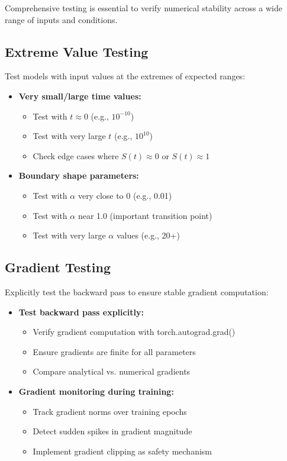 Comprehensive testing is essential to verify numerical stability across a wide range of inputs and conditions.

\subsection{Extreme Value Testing}

Test models with input values at the extremes of expected ranges:

\begin{itemize}
    \item \textbf{Very small/large time values:}
    \begin{itemize}
        \item Test with $t \approx 0$ (e.g., $10^{-10}$)
        \item Test with very large $t$ (e.g., $10^{10}$)
        \item Check edge cases where $S(t) \approx 0$ or $S(t) \approx 1$
    \end{itemize}
    
    \item \textbf{Boundary shape parameters:}
    \begin{itemize}
        \item Test with $\alpha$ very close to 0 (e.g., 0.01)
        \item Test with $\alpha$ near 1.0 (important transition point) 
        \item Test with very large $\alpha$ values (e.g., 20+)
    \end{itemize}
\end{itemize}

\subsection{Gradient Testing}

Explicitly test the backward pass to ensure stable gradient computation:

\begin{itemize}
    \item \textbf{Test backward pass explicitly:}
    \begin{itemize}
        \item Verify gradient computation with torch.autograd.grad()
        \item Ensure gradients are finite for all parameters
        \item Compare analytical vs. numerical gradients
    \end{itemize}
    
    \item \textbf{Gradient monitoring during training:}
    \begin{itemize}
        \item Track gradient norms over training epochs
        \item Detect sudden spikes in gradient magnitude
        \item Implement gradient clipping as safety mechanism
    \end{itemize}
\end{itemize}


